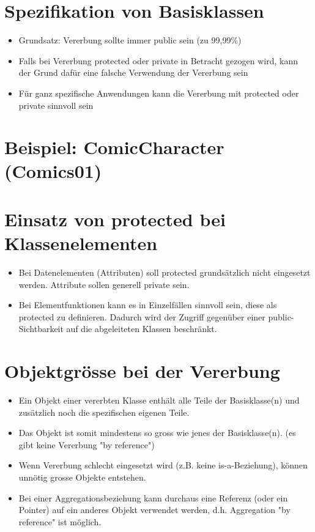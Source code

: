
\section{Spezifikation von Basisklassen}
\label{sec:Spezifikation von Basisklassen}
\begin{itemize}
	\item Grundsatz: Vererbung sollte immer public sein (zu 99,99\%)
	\item Falls bei Vererbung protected oder private in Betracht gezogen wird, kann der Grund dafür eine falsche Verwendung der Vererbung sein
	\item Für ganz spezifische Anwendungen kann die Vererbung mit protected oder private sinnvoll sein
\end{itemize}

\section{Beispiel: ComicCharacter (Comics01)}
\label{sec:Beispiel: ComicCharacter (Comics01)}



\section{Einsatz von protected bei Klassenelementen}
\label{sec:Einsatz von protected bei Klassenelementen}
\begin{itemize}
	\item Bei Datenelementen (Attributen) soll protected grundsätzlich nicht eingesetzt werden. Attribute sollen generell private sein.
	\item Bei Elementfunktionen kann es in Einzelfällen sinnvoll sein, diese als protected zu definieren. Dadurch wird der Zugriff gegenüber einer public-Sichtbarkeit auf die abgeleiteten Klassen beschränkt.
\end{itemize}

\section{Objektgrösse bei der Vererbung}
\label{sec:Objektgrösse bei der Vererbung}
\begin{itemize}
	\item Ein Objekt einer vererbten Klasse enthält alle Teile der Basisklasse(n) und zusätzlich noch die spezifischen eigenen Teile.
	\item Das Objekt ist somit mindestens so gross wie jenes der Basisklasse(n). (es gibt keine Vererbung "by reference")
	\item Wenn Vererbung schlecht eingesetzt wird (z.B. keine is-a-Beziehung), können unnötig grosse Objekte entstehen.
	\item Bei einer Aggregationsbeziehung kann durchaus eine Referenz (oder ein Pointer) auf ein anderes Objekt verwendet werden, d.h. Aggregation "by reference" ist möglich.
\end{itemize}


